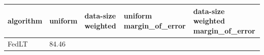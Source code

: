 \begin{tabular}{lllll}
\toprule
algorithm & uniform & data-size weighted & uniform margin_of_error & data-size weighted margin_of_error \\
\midrule
FedLT & 84.46%
\bottomrule
\end{tabular}
